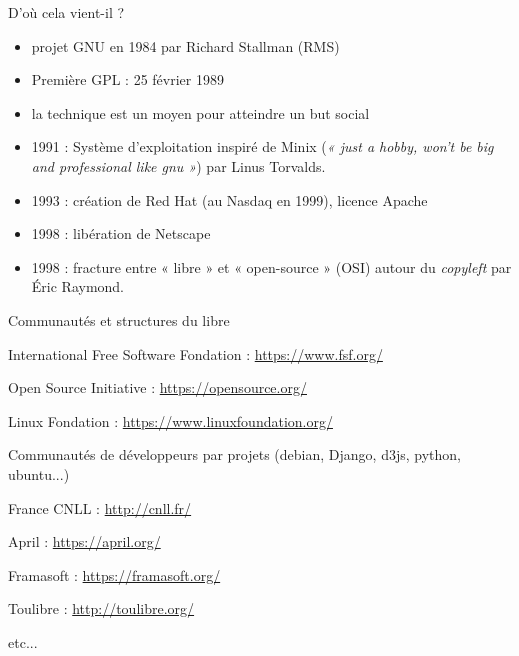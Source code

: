 \documentclass{beamer}
\begin{document}
\begin{frame}{D'où cela vient-il ?}
  \begin{itemize}
  \item projet GNU en 1984 par Richard Stallman (RMS)
  \item Première GPL : 25 février 1989
  \item la technique est un moyen pour atteindre un but social
  \item 1991 : Système d'exploitation inspiré de Minix (\textit{« just
      a hobby, won’t be big and professional like gnu »}) par Linus
    Torvalds.
  \item 1993 : création de Red Hat (au Nasdaq en 1999), licence Apache
  \item 1998 : libération de Netscape
  \item 1998 : fracture entre « libre » et « open-source » (OSI)
    autour du \textit{copyleft} par Éric Raymond.
  \end{itemize}
\end{frame}



\begin{frame}[plain]%
%  
\end{frame}



\begin{frame}[plain]%
%  
\end{frame}



\begin{frame}{Communautés et structures du libre}

  \begin{block}{International}
    Free Software Fondation : \url{https://www.fsf.org/}

    Open Source Initiative : \url{https://opensource.org/}

    Linux Fondation : \url{https://www.linuxfoundation.org/}

    Communautés de développeurs par projets (debian, Django, d3js,
    python, ubuntu...)
  \end{block}

  \pause

  \begin{block}{France}
    CNLL : \url{http://cnll.fr/}

    April : \url{https://april.org/}

    Framasoft : \url{https://framasoft.org/}

    Toulibre : \url{http://toulibre.org/}

    etc...
  \end{block}
\end{frame}
\end{document}
